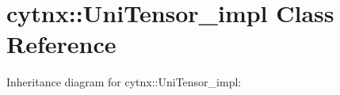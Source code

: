 \hypertarget{classcytnx_1_1UniTensor__impl}{}\section{cytnx\+:\+:Uni\+Tensor\+\_\+impl Class Reference}
\label{classcytnx_1_1UniTensor__impl}


Inheritance diagram for cytnx\+:\+:Uni\+Tensor\+\_\+impl\+:
